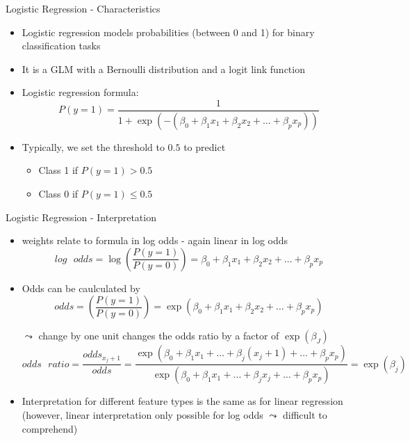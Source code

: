 \documentclass[11pt,compress,t,notes=noshow, aspectratio=169, xcolor=table]{beamer}
\begin{document}
\begin{frame}{Logistic Regression - Characteristics}

\begin{itemize}
    \item Logistic regression models probabilities (between 0 and 1) for binary classification tasks 
    \item It is a GLM with a Bernoulli distribution and a logit link function
    \item Logistic regression formula:
    $$P(y = 1) =\frac{1}{1 + \exp(-( \beta_0 + \beta_1 x_1 + \beta_2 x_2 + \ldots + \beta_p x_p ))} $$
    \item Typically, we set the threshold to $0.5$ to predict 
        \begin{itemize}
            \item Class 1 if $P(y=1) > 0.5$
            \item Class 0 if $P(y=1) \leq 0.5$
        \end{itemize}
\end{itemize}
    

	

\end{frame}


\begin{frame}[c]{Logistic Regression - Interpretation}

    
    
    
    

    \begin{itemize}
        \item weights relate to formula in log odds - again linear in log odds
        $$log\text{ }odds = \log \left(\frac{P(y = 1)}{P(y=0)}\right) = \beta_0 + \beta_1 x_1 + \beta_2 x_2 + \ldots + \beta_p x_p  $$
        \item Odds can be caulculated by 
        $$odds = \left(\frac{P(y = 1)}{P(y=0)}\right) = \exp(\beta_0 + \beta_1 x_1 + \beta_2 x_2 + \ldots + \beta_p x_p)  $$
        \item[$\leadsto$] change by one unit changes the odds ratio by a \alert{factor} of $\exp(\beta_J)$
        $$odds\text{ }ratio = \frac{odds_{x_j+1}}{odds} = \frac{\exp(\beta_0 + \beta_1 x_1 + \ldots + \beta_j (x_j+1) + \ldots + \beta_p x_p)}{\exp(\beta_0 + \beta_1 x_1 + \ldots + \beta_j x_j + \ldots + \beta_p x_p)} = \exp{(\beta_j)} $$
        \item Interpretation for different feature types is the same as for linear regression (however, linear interpretation only possible for log odds $\leadsto$ difficult to comprehend)
    \end{itemize}	

\end{frame}
\end{document}
